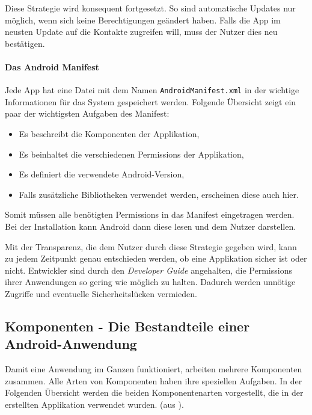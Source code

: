 Diese Strategie wird konsequent fortgesetzt. So sind automatische Updates nur möglich, wenn sich keine Berechtigungen geändert haben. Falls die App im neusten Update auf die Kontakte zugreifen will, muss der Nutzer dies neu bestätigen.

\paragraph{Das Android Manifest}

Jede App hat eine Datei mit dem Namen \verb+AndroidManifest.xml+ in der wichtige Informationen für das System gespeichert werden. Folgende Übersicht zeigt ein paar der wichtigsten Aufgaben des Manifest:

\begin{itemize}
	\item Es beschreibt die Komponenten der Applikation,
	\item Es beinhaltet die verschiedenen Permissions der Applikation,
	\item Es definiert die verwendete Android-Version,
	\item Falls zusätzliche Bibliotheken verwendet werden, erscheinen diese auch hier.
\end{itemize}

Somit müssen alle benötigten Permissions in das Manifest eingetragen werden. Bei der Installation kann Android dann diese lesen und dem Nutzer darstellen.

Mit der Transparenz, die dem Nutzer durch diese Strategie gegeben wird, kann zu jedem Zeitpunkt genau entschieden werden, ob eine Applikation sicher ist oder nicht. Entwickler sind durch den \emph{Developer Guide} \cite{android_api} angehalten, die Permissions ihrer Anwendungen so gering wie möglich zu halten. Dadurch werden unnötige Zugriffe und eventuelle Sicherheitslücken vermieden.

\subsection{Komponenten - Die Bestandteile einer Android-Anwendung}
\label{components}

Damit eine Anwendung im Ganzen funktioniert, arbeiten mehrere Komponenten zusammen. Alle Arten von Komponenten haben ihre speziellen Aufgaben. In der Folgenden Übersicht werden die beiden Komponentenarten vorgestellt, die in der erstellten Applikation verwendet wurden. (aus \cite{android_components}).


